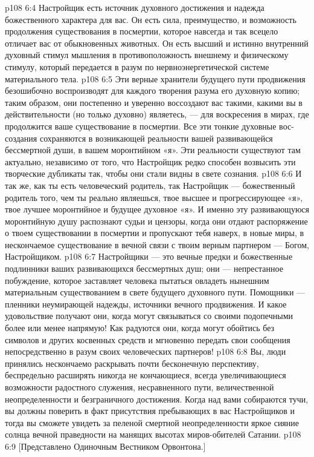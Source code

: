 \vs p108 6:4 Настройщик есть источник духовного достижения и надежда божественного характера для вас. Он есть сила, преимущество, и возможность продолжения существования в посмертии, которое навсегда и так всецело отличает вас от обыкновенных животных. Он есть высший и истинно внутренний духовный стимул мышления в противоположность внешнему и физическому стимулу, который передается в разум по нервноэнергетической системе материального тела.
\vs p108 6:5 Эти верные хранители будущего пути продвижения безошибочно воспроизводят для каждого творения разума его духовную копию; таким образом, они постепенно и уверенно воссоздают вас такими, какими вы в действительности (но только духовно) являетесь, --- для воскресения в мирах, где продолжится ваше существование в посмертии. Все эти тонкие духовные вос\hyp{}создания сохраняются в возникающей реальности вашей развивающейся бессмертной души, в вашем моронтийном «я». Эти реальности существуют там актуально, независимо от того, что Настройщик редко способен возвысить эти творческие дубликаты так, чтобы они стали видны в свете сознания.
\vs p108 6:6 \pc И так же, как ты есть человеческий родитель, так Настройщик --- божественный родитель того, чем ты реально являешься, твое высшее и прогрессирующее «я», твое лучшее моронтийное и будущее духовное «я». И именно эту развивающуюся моронтийную душу распознают судьи и цензоры, когда они отдают распоряжение о твоем существовании в посмертии и пропускают тебя наверх, в новые миры, в нескончаемое существование в вечной связи с твоим верным партнером --- Богом, Настройщиком.
\vs p108 6:7 Настройщики --- это вечные предки и божественные подлинники ваших развивающихся бессмертных душ; они --- непрестанное побуждение, которое заставляет человека пытаться овладеть нынешним материальным существованием в свете будущего духовного пути. Помощники --- пленники неумирающей надежды, источники вечного продвижения. И какое удовольствие получают они, когда могут связываться со своими подопечными более или менее напрямую! Как радуются они, когда могут обойтись без символов и других косвенных средств и мгновенно передать свои сообщения непосредственно в разум своих человеческих партнеров!
\vs p108 6:8 \pc Вы, люди принялись нескончаемо раскрывать почти бесконечную перспективу, беспредельно расширять никогда не кончающиеся, всегда увеличивающиеся возможности радостного служения, несравненного пути, величественной неопределенности и безграничного достижения. Когда над вами собираются тучи, вы должны поверить в факт присутствия пребывающих в вас Настройщиков и тогда вы сможете увидеть за пеленой смертной неопределенности яркое сияние солнца вечной праведности на манящих высотах миров\hyp{}обителей Сатании.
\vsetoff
\vs p108 6:9 [Представлено Одиночным Вестником Орвонтона.]
